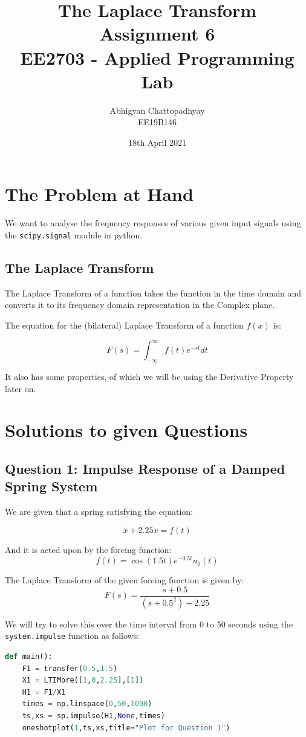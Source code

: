 \documentclass[12pt]{article}
\title{\vspace{-1cm}The Laplace Transform\\
\large Assignment 6\\
\large EE2703 - Applied Programming Lab}
\author{Abhigyan Chattopadhyay \\
EE19B146}
\date{18th April 2021}
\begin{document}
\maketitle
\tableofcontents
\pagebreak
\section{The Problem at Hand}
We want to analyse the frequency responses of various given input signals using the \texttt{scipy.signal} module in python.

\subsection{The Laplace Transform}
The Laplace Transform of a function takes the function in the time domain and converts it to its frequency domain representation in the Complex plane.

The equation for the (bilateral) Laplace Transform of a function $f(x)$ is:

$$F(s) = \int_{-\infty}^{\infty} f(t) e^{-st} dt$$

It also has some properties, of which we will be using the Derivative Property later on.

\section{Solutions to given Questions}

\subsection{Question 1: Impulse Response of a Damped Spring System}

We are given that a spring satisfying the equation:

$$\ddot x + 2.25x = f(t)$$

And it is acted upon by the forcing function:
$$f(t) = \cos(1.5t)e^{-0.5t}u_0(t)$$

The Laplace Transform of the given forcing function is given by:
$$F(s) = \frac{s+0.5}{(s+0.5^2)+2.25}$$

We will try to solve this over the time interval from 0 to 50 seconds using the \texttt{system.impulse} function as follows:

\begin{lstlisting}[language=Python]
def main():
    F1 = transfer(0.5,1.5)
    X1 = LTIMore([1,0,2.25],[1])
    H1 = F1/X1
    times = np.linspace(0,50,1000)
    ts,xs = sp.impulse(H1,None,times)
    oneshotplot(1,ts,xs,title="Plot for Question 1")
\end{lstlisting}
\end{document}
